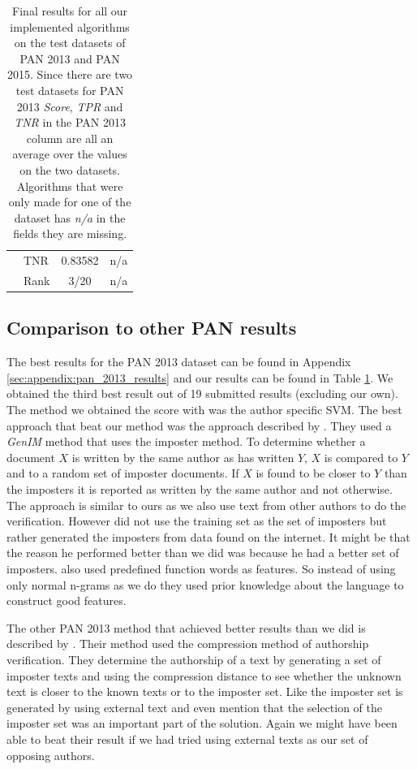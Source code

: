 \begin{table}
\begin{tabular}{ll|cc}
                                  & \gls{TNR} & 0.83582           & n/a               \\
                                  & Rank      & 3/20              & n/a
    \end{tabular}
    \caption{Final results for all our implemented algorithms on the test
        datasets of PAN 2013 and PAN 2015. Since there are two test datasets for
        PAN 2013 \textit{Score}, \textit{\gls{TPR}} and \textit{\gls{TNR}} in
        the PAN 2013 column are all an average over the values on the two
        datasets. Algorithms that were only made for one of the dataset has
        \textit{n/a} in the fields they are missing.}
    \label{tab:all_final_results}
\end{table}

\subsection{Comparison to other PAN results}
The best results for the PAN 2013 dataset can be found in Appendix
\ref{sec:appendix:pan_2013_results} and our results can be found in Table
\ref{tab:all_final_results}. We obtained the third best result out of 19
submitted results (excluding our own). The method we obtained the score with
was the author specific SVM. The best approach that beat our method was the
approach described by \cite{seidman:2013}. They used a \textit{GenIM} method
that uses the imposter method. To determine whether a document $X$ is written by
the same author as has written $Y$, $X$ is compared to $Y$ and to a random set
of imposter documents. If $X$ is found to be closer to $Y$ than the imposters
it is reported as written by the same author and not otherwise. The approach is
similar to ours as we also use text from other authors to do the verification.
However \cite{seidman:2013} did not use the training set as the set of imposters
but rather generated the imposters from data found on the internet. It might
be that the reason he performed better than we did was because he had a better
set of imposters. \cite{seidman:2013} also used predefined function words as
features. So instead of using only normal n-grams as we do they used prior
knowledge about the language to construct good features.

The other PAN 2013 method that achieved better results than we did is described
by \cite{veenman:2013}. Their method used the compression method of authorship
verification. They determine the authorship of a text by generating a set
of imposter texts and using the compression distance to see whether the
unknown text is closer to the known texts or to the imposter set. Like
\cite{seidman:2013} the imposter set is generated by using external text and
\cite{veenman:2013} even mention that the selection of the imposter set was an
important part of the solution. Again we might have been able to beat their
result if we had tried using external texts as our set of opposing authors.


